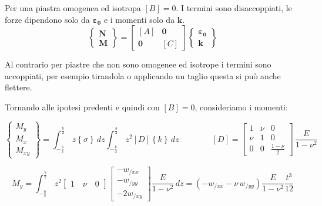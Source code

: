 Per una piastra omogenea ed isotropa $[B]=0$. I termini sono disaccoppiati, le forze dipendono solo da $\boldsymbol{\varepsilon_0}$ e i momenti solo da $\boldsymbol{k}$.
\begin{equation*}
\left\{
\begin{array}{c}
\boldsymbol{N}\\
\boldsymbol{M}
\end{array}
\right\}
=
\begin{bmatrix}
[A] & \boldsymbol{0} \\
\boldsymbol{0} & [C]
\end{bmatrix}
\left\{
\begin{array}{c}
\boldsymbol{\varepsilon_0}\\
\boldsymbol{k}
\end{array}
\right\}
\end{equation*}

Al contrario per piastre che non sono omogenee ed isotrope i termini sono accoppiati, per esempio tirandola o applicando un taglio questa si può anche flettere.

Tornando alle ipotesi predenti e quindi con $[B]=0$, consideriamo i momenti:


\begin{equation*}
    \left\{
\begin{array}{c}
M_y \\
M_x\\
M_{xy}
\end{array}
\right\} = \int_{-\frac{b}{2}}^{\frac{b}{2}}\,  z\left\{\sigma\right\} \,dz
 \int_{-\frac{b}{2}}^{\frac{b}{2}}\,z^2 [D] \left\{k\right\} \,dz
\qquad \qquad [D]=
\left[
\begin{array}{ccc}
\displaystyle 1 & \displaystyle \nu & \displaystyle 0\\
\displaystyle \nu & \displaystyle 1 & \displaystyle 0 \\
\displaystyle 0& \displaystyle 0 & \displaystyle \frac{1-\nu}{2}
\end{array}
\right]\,
\frac{E}{1-\nu^2}
\end{equation*}

\begin{equation*}
   M_y =  \int_{-\frac{b}{2}}^{\frac{b}{2}}\,z^2 
   \left[\begin{array}{c}
1\quad\nu\quad0
\end{array} \right] 
   \left[
   \begin{array}{c}
-w_{/xx} \\-w_{/yy}\\-2w_{/xy}
\end{array} \right] \frac{E}{1-\nu^2}\,dz
=(-w_{/xx} -\nu \,w_{/yy}) \frac{E}{1-\nu^2}\frac{t^3}{12}
\end{equation*}

